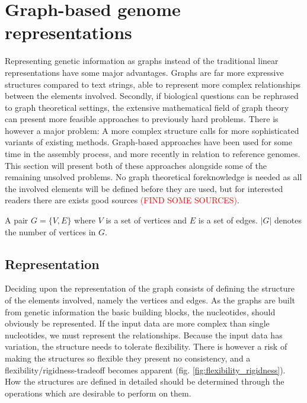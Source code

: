 \documentclass[thesis.tex]{subfiles}
\begin{document}
\section{Graph-based genome representations}
Representing genetic information as graphs instead of the traditional linear representations have some major advantages. Graphs are far more expressive structures compared to text strings, able to represent more complex relationships between the elements involved. Secondly, if biological questions can be rephrased to graph theoretical settings, the extensive mathematical field of graph theory can present more feasible approaches to previously hard problems. There is however a major problem: A more complex structure calls for more sophisticated variants of existing methods. Graph-based approaches have been used for some time in the assembly process, and more recently in relation to reference genomes. This section will present both of these approaches alongside some of the remaining unsolved problems. No graph theoretical foreknowledge is needed as all the involved elements will be defined before they are used, but for interested readers there are exists good sources \textcolor{red}{(FIND SOME SOURCES)}.
\begin{defn}[Graph]
  A pair $G=\{V,E\}$ where $V$ is a set of vertices and $E$ is a set of edges. $|G|$ denotes the number of vertices in $G$.
\end{defn}
\subsection{Representation}
Deciding upon the representation of the graph consists of defining the structure of the elements involved, namely the vertices and edges. As the graphs are built from genetic information the basic building blocks, the nucleotides, should obviously be represented. If the input data are more complex than single nucleotides, we must represent the relationships. Because the input data has variation, the structure needs to tolerate flexibility. There is however a risk of making the structures so flexible they present no consistency, and a flexibility/rigidness-tradeoff becomes apparent (fig. \ref{fig:flexibility_rigidness}). How the structures are defined in detailed should be determined through the operations which are desirable to perform on them.
\end{document}
